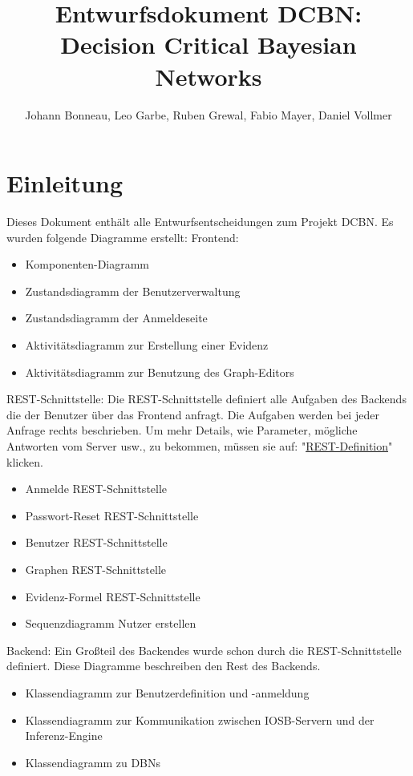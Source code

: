 \documentclass{article}
\title{Entwurfsdokument
DCBN: Decision Critical Bayesian Networks}
\author{Johann Bonneau, Leo Garbe, Ruben Grewal, Fabio Mayer, Daniel Vollmer}
\begin{document}
\maketitle
\tableofcontents

\newpage
\section{Einleitung} 
    Dieses Dokument enthält alle Entwurfsentscheidungen zum Projekt DCBN. Es wurden folgende Diagramme erstellt:
    \newline
    \newline
    Frontend:
\begin{itemize}
    \item Komponenten-Diagramm
    \item Zustandsdiagramm der Benutzerverwaltung
    \item Zustandsdiagramm der Anmeldeseite
    \item Aktivitätsdiagramm zur Erstellung einer Evidenz
    \item Aktivitätsdiagramm zur Benutzung des Graph-Editors
\end{itemize}
REST-Schnittstelle:
Die REST-Schnittstelle definiert alle Aufgaben des Backends die der Benutzer über das Frontend anfragt. Die Aufgaben werden bei jeder Anfrage rechts beschrieben. Um mehr Details, wie Parameter, mögliche Antworten vom Server usw., zu bekommen, müssen sie auf: "\href{https://devleoko.github.io/Decision-Critical-Bayesian-Networks/}{REST-Definition}" klicken.
\begin{itemize}
    \item Anmelde REST-Schnittstelle
    \item Passwort-Reset REST-Schnittstelle
    \item Benutzer REST-Schnittstelle
    \item Graphen REST-Schnittstelle
    \item Evidenz-Formel REST-Schnittstelle
    \item Sequenzdiagramm Nutzer erstellen
\end{itemize}
Backend:
Ein Großteil des Backendes wurde schon durch die REST-Schnittstelle definiert. Diese Diagramme beschreiben den Rest des Backends. 
\begin{itemize}
    \item Klassendiagramm zur Benutzerdefinition und -anmeldung
    \item Klassendiagramm zur Kommunikation zwischen IOSB-Servern und der Inferenz-Engine
    \item Klassendiagramm zu DBNs
\end{itemize}
\newpage
\end{document}
